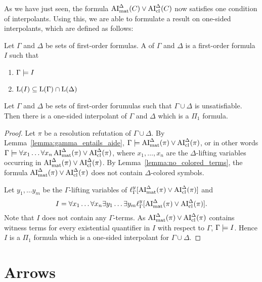 \documentclass[,%
	draft=false,%
	numbers=noendperiod
	11pt,
	a4paper,
	oneside,%
	openany,
]{memoir}
\begin{document}
As we have just seen, the formula $\operatorname{AI}_\mathrm{mat}^\Delta(C) \lor \operatorname{AI}_\mathrm{cl}^\Delta(C)$ now satisfies one condition of interpolants.
Using this, we are able to formulate a result on one-sided interpolants, which are defined as follows:

\begin{defi}
	Let $\Gamma$ and $\Delta$ be sets of first-order formulas.
	A  of $\Gamma$ and $\Delta$ is a first-order formula $I$ such that 
	\begin{enumerate}
		\item $\Gamma \models I$
		\item $\operatorname{L}(I) \subseteq \operatorname{L}(\Gamma) \cap \operatorname{L}(\Delta)$
			\qedhere
	\end{enumerate}
\end{defi}

\begin{prop}
	Let $\Gamma$ and $\Delta$ be sets of first-order forumulas such that $\Gamma\cup\Delta$ is unsatisfiable.
	Then there is a one-sided interpolant of $\Gamma$ and $\Delta$ which is a $\Pi_1$ formula.
\end{prop}
\begin{proof}
	Let $\pi$ be a resolution refutation of $\Gamma\cup\Delta$.
	By Lemma~\ref{lemma:gamma_entails_aide}, $\Gamma \models \operatorname{AI}_\mathrm{mat}^\Delta(\pi) \lor \operatorname{AI}_\mathrm{cl}^\Delta(\pi)$,
	or in other words 
	$\Gamma \models \forall x_1 \dots \forall x_n  \operatorname{AI}_\mathrm{mat}^\Delta(\pi) \lor \operatorname{AI}_\mathrm{cl}^\Delta(\pi)$, where $x_1, \dots, x_n$ are the $\Delta$-lifting variables occurring in $\operatorname{AI}_\mathrm{mat}^\Delta(\pi) \lor \operatorname{AI}_\mathrm{cl}^\Delta(\pi)$.
	By Lemma~\ref{lemma:no_colored_terms}, the formula $\operatorname{AI}_\mathrm{mat}^\Delta(\pi) \lor \operatorname{AI}_\mathrm{cl}^\Delta(\pi)$ does not contain $\Delta$-colored symbols.

	Let $y_1, \dots y_m$ be the $\Gamma$-lifting variables of $\ell_{\Gamma}^{y}[\operatorname{AI}_\mathrm{mat}^\Delta(\pi) \lor \operatorname{AI}_\mathrm{cl}^\Delta(\pi)]$ 
	and
	\[I = \forall x_1 \dots \forall x_n \exists y_1 \dots \exists y_m \ell_{\Gamma}^{y}[\operatorname{AI}_\mathrm{mat}^\Delta(\pi) \lor \operatorname{AI}_\mathrm{cl}^\Delta(\pi)].\]
	Note that $I$ does not contain any $\Gamma$-terms.
	As $\operatorname{AI}_\mathrm{mat}^\Delta(\pi) \lor \operatorname{AI}_\mathrm{cl}^\Delta(\pi)$ contains witness terms for every existential quantifier in $I$ with respect to $\Gamma$, $\Gamma \models I$.
	Hence $I$ is a $\Pi_1$ formula which is a one-sided interpolant for $\Gamma \cup \Delta$.
\end{proof}


\section{Arrows}
\end{document}
